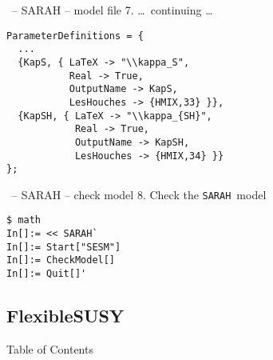 \documentclass[11pt]{beamer}
\newcommand{\SARAH}{\texttt{SARAH}}
\begin{document}

\begin{frame}[fragile]{\insertsection\ -- SARAH -- model file}
  7. \ldots\ continuing \ldots
  \begin{lstlisting}
ParameterDefinitions = {
  ...
  {KapS, { LaTeX -> "\\kappa_S",
           Real -> True,
           OutputName -> KapS,
           LesHouches -> {HMIX,33} }},
  {KapSH, { LaTeX -> "\\kappa_{SH}",
            Real -> True,
            OutputName -> KapSH,
            LesHouches -> {HMIX,34} }}
};\end{lstlisting}
\end{frame}


\begin{frame}[fragile]{\insertsection\ -- SARAH -- check model}
  8. Check the \SARAH\ model
  \begin{lstlisting}
$ math
In[]:= << SARAH`
In[]:= Start["SESM"]
In[]:= CheckModel[]
In[]:= Quit[]'\end{lstlisting}%
\end{frame}


\subsection{FlexibleSUSY}


\begin{frame}{Table of Contents}
\end{frame}

\end{document}
